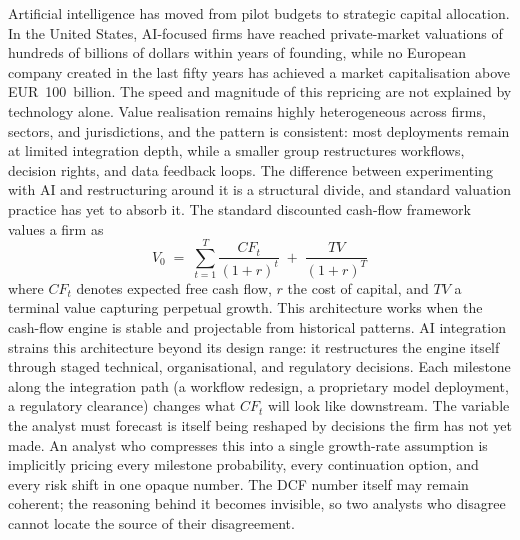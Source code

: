 \documentclass[oneside,10pt]{swissi}
\begin{document}
Artificial intelligence has moved from pilot budgets to strategic capital allocation. In the United States, AI-focused firms have reached private-market valuations of hundreds of billions of dollars within years of founding,\cite{anthropic2026seriesg,databricks2025seriesk} while no European company created in the last fifty years has achieved a market capitalisation above EUR~100~billion.\cite{draghi2024competitiveness} The speed and magnitude of this repricing are not explained by technology alone. Value realisation remains highly heterogeneous across firms, sectors, and jurisdictions,\cite{mckinsey2025rewiring,mckinsey2025stateai,brynjolfsson2023generativework,eisfeldt2023firmvalues} and the pattern is consistent: most deployments remain at limited integration depth, while a smaller group restructures workflows, decision rights, and data feedback loops.\cite{mckinsey2025rewiring,mckinsey2025stateai} The difference between experimenting with AI and restructuring around it is a structural divide, and standard valuation practice has yet to absorb it. The standard discounted cash-flow framework values a firm as
\begin{equation}\label{eq:dcf}
V_0 \;=\; \sum_{t=1}^{T} \frac{\mathit{CF}_t}{(1+r)^t} \;+\; \frac{\mathit{TV}}{(1+r)^T}
\end{equation}
where $\mathit{CF}_t$ denotes expected free cash flow, $r$ the cost of capital, and $\mathit{TV}$ a terminal value capturing perpetual growth.\cite{koller2020valuation} This architecture works when the cash-flow engine is stable and projectable from historical patterns. AI integration strains this architecture beyond its design range: it restructures the engine itself through staged technical, organisational, and regulatory decisions.\cite{schwartz2000internet,benaroch1999isre} Each milestone along the integration path (a workflow redesign, a proprietary model deployment, a regulatory clearance) changes what $\mathit{CF}_t$ will look like downstream. The variable the analyst must forecast is itself being reshaped by decisions the firm has not yet made. An analyst who compresses this into a single growth-rate assumption is implicitly pricing every milestone probability, every continuation option, and every risk shift in one opaque number. The DCF number itself may remain coherent; the reasoning behind it becomes invisible, so two analysts who disagree cannot locate the source of their disagreement.
\end{document}

